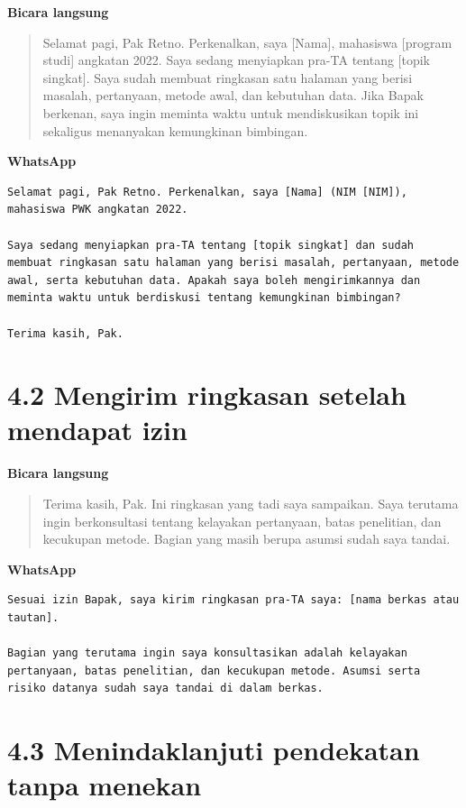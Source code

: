 \documentclass[
  indonesian,
]{article}
\renewcommand{\subsection}{\section}
\begin{document}
\textbf{Bicara langsung}

\begin{quote}
Selamat pagi, Pak Retno. Perkenalkan, saya {[}Nama{]}, mahasiswa
{[}program studi{]} angkatan 2022. Saya sedang menyiapkan pra-TA tentang
{[}topik singkat{]}. Saya sudah membuat ringkasan satu halaman yang
berisi masalah, pertanyaan, metode awal, dan kebutuhan data. Jika Bapak
berkenan, saya ingin meminta waktu untuk mendiskusikan topik ini
sekaligus menanyakan kemungkinan bimbingan.
\end{quote}

\textbf{WhatsApp}

\begin{verbatim}
Selamat pagi, Pak Retno. Perkenalkan, saya [Nama] (NIM [NIM]), mahasiswa PWK angkatan 2022.

Saya sedang menyiapkan pra-TA tentang [topik singkat] dan sudah membuat ringkasan satu halaman yang berisi masalah, pertanyaan, metode awal, serta kebutuhan data. Apakah saya boleh mengirimkannya dan meminta waktu untuk berdiskusi tentang kemungkinan bimbingan?

Terima kasih, Pak.
\end{verbatim}

\subsection{4.2 Mengirim ringkasan setelah mendapat
izin}\label{mengirim-ringkasan-setelah-mendapat-izin}

\textbf{Bicara langsung}

\begin{quote}
Terima kasih, Pak. Ini ringkasan yang tadi saya sampaikan. Saya terutama
ingin berkonsultasi tentang kelayakan pertanyaan, batas penelitian, dan
kecukupan metode. Bagian yang masih berupa asumsi sudah saya tandai.
\end{quote}

\textbf{WhatsApp}

\begin{verbatim}
Sesuai izin Bapak, saya kirim ringkasan pra-TA saya: [nama berkas atau tautan].

Bagian yang terutama ingin saya konsultasikan adalah kelayakan pertanyaan, batas penelitian, dan kecukupan metode. Asumsi serta risiko datanya sudah saya tandai di dalam berkas.
\end{verbatim}

\subsection{4.3 Menindaklanjuti pendekatan tanpa
menekan}\label{menindaklanjuti-pendekatan-tanpa-menekan}
\end{document}
